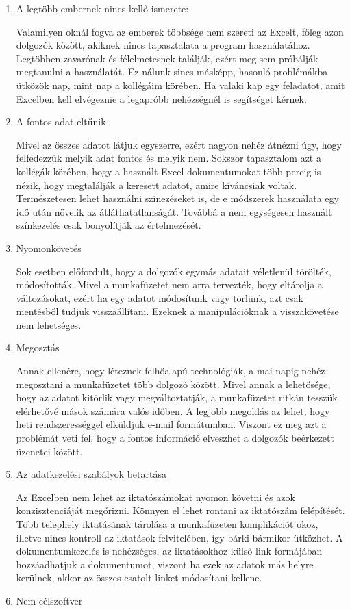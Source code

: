 \documentclass[
]{thesis-ekf}
\theoremstyle{definition}
\theoremstyle{remark}
\begin{document}
\begin{enumerate}[leftmargin=0pt]
	\item A legtöbb embernek nincs kellő ismerete: 
	
Valamilyen oknál fogva az emberek többsége nem szereti az Excelt, főleg azon dolgozók között, akiknek nincs tapasztalata a program használatához. Legtöbben zavarónak és félelmetesnek találják, ezért meg sem próbálják megtanulni a használatát. Ez nálunk sincs másképp, hasonló problémákba ütközök nap, mint nap a kollégáim körében. Ha valaki kap egy feladatot, amit Excelben kell elvégeznie a legapróbb nehézségnél is segítséget kérnek.
   \item A fontos adat eltűnik
  
Mivel az összes adatot látjuk egyszerre, ezért nagyon nehéz átnézni úgy, hogy felfedezzük melyik adat fontos és melyik nem. Sokszor tapasztalom azt a kollégák körében, hogy a használt Excel dokumentumokat több percig is nézik, hogy megtalálják a keresett adatot, amire kíváncsiak voltak. Természetesen lehet használni színezéseket is, de e módszerek használata egy idő után növelik az átláthatatlanságát. Továbbá a nem egységesen használt színkezelés csak bonyolítják az értelmezését.
	\item Nyomonkövetés
	
Sok esetben előfordult, hogy a dolgozók egymás adatait véletlenül törölték, módosították. Mivel a munkafüzetet nem arra tervezték, hogy eltárolja a változásokat, ezért ha egy adatot módosítunk vagy törlünk, azt csak mentésből tudjuk visszaállítani. Ezeknek a manipulációknak a visszakövetése nem lehetséges. 
	\item Megosztás
	
Annak ellenére, hogy léteznek felhőalapú technológiák, a mai napig nehéz megosztani a munkafüzetet több dolgozó között. Mivel annak a lehetősége, hogy az adatot kitörlik vagy megváltoztatják, a munkafüzetet ritkán tesszük elérhetővé mások számára valós időben. A legjobb megoldás az lehet, hogy heti rendszerességgel elküldjük e-mail formátumban. Viszont ez meg azt a problémát veti fel, hogy a fontos információ elveszhet a dolgozók beérkezett üzenetei között.
	\item Az adatkezelési szabályok betartása 
	
Az Excelben nem lehet az iktatószámokat nyomon követni és azok konzisztenciáját megőrizni. Könnyen el lehet rontani az iktatószám felépítését. Több telephely iktatásának tárolása a munkafüzeten komplikációt okoz, illetve nincs kontroll az iktatások felvitelében, így bárki bármikor ütközhet. A dokumentumkezelés is nehézséges, az iktatásokhoz külső link formájában hozzáadhatjuk a dokumentumot, viszont ha ezek az adatok más helyre kerülnek, akkor az összes csatolt linket módosítani kellene. 
	\item Nem célszoftver
	

\end{enumerate}
\end{document}
